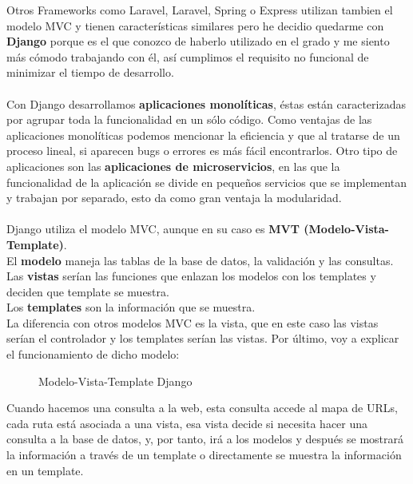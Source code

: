 Otros Frameworks como Laravel, Laravel, Spring o Express utilizan tambien el modelo MVC y tienen características similares pero he decidio quedarme con \textbf{Django} porque es el que conozco de 
haberlo utilizado en el grado y me siento más cómodo trabajando con él, así cumplimos el requisito no funcional de minimizar el tiempo de desarrollo.\\ \\

Con Django desarrollamos \textbf{aplicaciones monolíticas}, éstas están caracterizadas por agrupar toda la funcionalidad en un sólo código. Como ventajas de las aplicaciones monolíticas 
podemos mencionar la eficiencia y que al tratarse de un proceso lineal, si aparecen bugs o errores es más fácil encontrarlos. Otro tipo de aplicaciones son las \textbf{aplicaciones de microservicios}, en las que la funcionalidad 
de la aplicación se divide en pequeños servicios que se implementan y trabajan por separado, esto da como gran ventaja la modularidad.\\ \\

Django utiliza el modelo MVC, aunque en su caso es \textbf{MVT (Modelo-Vista-Template)}.\\
El \textbf{modelo} maneja las tablas de la base de datos, la validación y las consultas.\\
Las \textbf{vistas} serían las funciones que enlazan los modelos con los templates y deciden que template se muestra.\\
Los \textbf{templates} son la información que se muestra.\\ 

La diferencia con otros modelos MVC es la vista, que en este caso las vistas serían el controlador y los templates serían las vistas.
Por último, voy a explicar el funcionamiento de dicho modelo:

\begin{figure}[H]
  \centering
  \noindent{}
  \caption{Modelo-Vista-Template Django}
\end{figure}

Cuando hacemos una consulta a la web, esta consulta accede al mapa de URLs, cada ruta está asociada a una vista, 
esa vista decide si necesita hacer una consulta a la base de datos, y, por tanto, irá a los modelos y después se 
mostrará la información a través de un template o directamente se muestra la información en un template.

